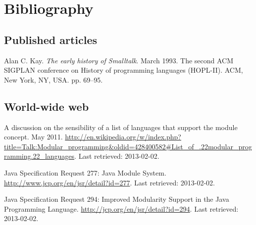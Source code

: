 \chapter*{Bibliography}

\renewcommand{\chapter}[2]{}%

\section*{Published articles}

\begin{thebibliography}{}


Alan C. Kay. \emph{The early history of Smalltalk}. March 1993. The second ACM
SIGPLAN conference on History of programming languages (HOPL-II). ACM, New
York, NY, USA. pp. 69--95.

\end{thebibliography}

\section*{World-wide web}

\begin{thebibliography}{}


A discussion on the sensibility of a list of languages that support the module
concept. May 2011.
\url{http://en.wikipedia.org/w/index.php?title=Talk:Modular_programming&oldid=428400582#List_of_.22modular_programming.22_languages}.
Last retrieved: 2013-02-02.


Java Specification Request 277: Java\textsuperscript{\texttrademark} Module
System. \url{http://www.jcp.org/en/jsr/detail?id=277}. Last retrieved:
2013-02-02.


Java Specification Request 294: Improved Modularity Support in the
Java\textsuperscript{\texttrademark} Programming Language.
\url{http://jcp.org/en/jsr/detail?id=294}. Last retrieved: 2013-02-02.

\end{thebibliography}
